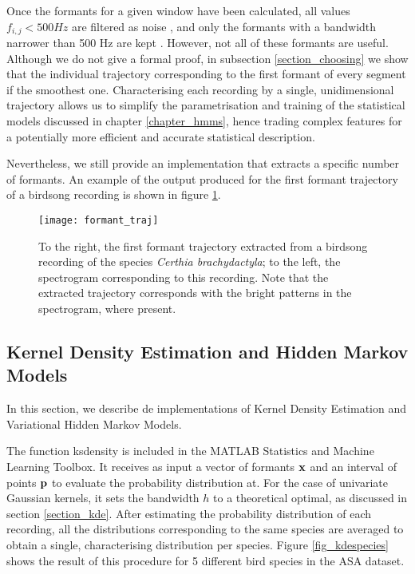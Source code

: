 \documentclass[../main.tex]{subfiles}
\begin{document}
\par Once the formants for a given window have been calculated, all values $f_{i, j} < 500 Hz$ are filtered as noise \cite{Stowell2014}, and only the formants with a bandwidth narrower than 500 Hz are kept \cite{Mathworks2015}. However, not all of these formants are useful. Although we do not give a formal proof, in subsection \ref{section_choosing} we show that the individual trajectory corresponding to the first formant of every segment if the smoothest one. Characterising each recording by a single, unidimensional trajectory allows us to simplify the parametrisation and training of the statistical models discussed in chapter \ref{chapter_hmms}, hence trading complex features for a potentially more efficient and accurate statistical description.
\par Nevertheless, we still provide an implementation that extracts a specific number of formants. An example of the output produced for the first formant trajectory of a birdsong recording is shown in figure \ref{fig_traj}.

\begin{figure}[t]
\centering
\texttt{[image: formant\_traj]}
\caption{To the right, the first formant trajectory extracted from a birdsong recording of the species \emph{Certhia brachydactyla}; to the left, the spectrogram corresponding to this recording. Note that the extracted trajectory corresponds with the bright patterns in the spectrogram, where present.}
\label{fig_traj}
\end{figure}

\subsection{Kernel Density Estimation and Hidden Markov Models} \label{section_imphmms}
In this section, we describe de implementations of Kernel Density Estimation and Variational Hidden Markov Models.
\par The function ksdensity is included in the MATLAB Statistics and Machine Learning Toolbox. It receives as input a vector of formants $\mathbf{x}$ and an interval of points $\mathbf{p}$ to evaluate the probability distribution at. For the case of univariate Gaussian kernels, it sets the bandwidth $h$ to a theoretical optimal, as discussed in section \ref{section_kde}. After estimating the probability distribution of each recording, all the distributions corresponding to the same species are averaged to obtain a single, characterising distribution per species. Figure \ref{fig_kdespecies} shows the result of this procedure for 5 different bird species in the ASA dataset.
\end{document}
